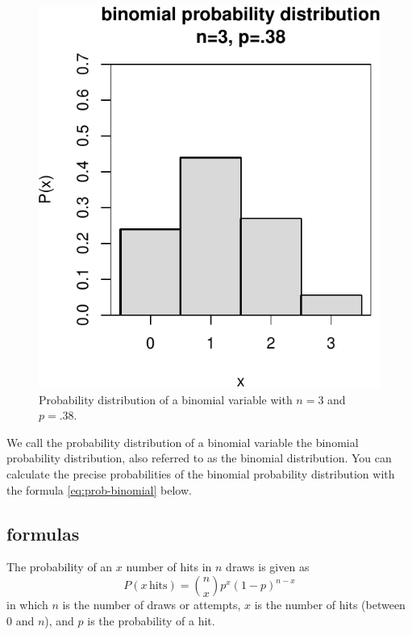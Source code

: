 \documentclass[
]{book}
\begin{document}
\begin{figure}
\centering
\includegraphics{QMS-EN_files/figure-latex/binomprobabilitydistribution3-1.pdf}
\caption{\label{fig:binomprobabilitydistribution3}Probability distribution of a binomial variable with \(n=3\) and \(p=.38\).}
\end{figure}

We call the probability distribution of a binomial variable the binomial
probability distribution, also referred to as the binomial distribution.
You can calculate the precise probabilities of the binomial
probability distribution with the formula \eqref{eq:prob-binomial} below.

\hypertarget{formulas}{%
\subsection{formulas}\label{formulas}}

The probability of an \(x\) number of hits in \(n\) draws is given as
\begin{equation}
  P(x\,\mbox{hits}) = {n \choose x} p^x (1-p)^{n-x}
  \label{eq:prob-binomial}
\end{equation}
in which \(n\) is the number of draws or attempts, \(x\) is the number of hits
(between 0 and \(n\)), and \(p\) is the probability of a hit.
\end{document}
